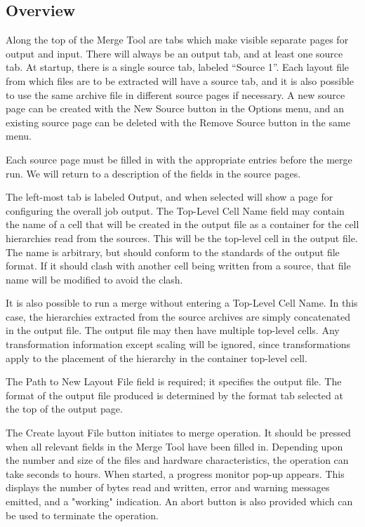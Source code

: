 \subsection{Overview}

Along the top of the {\cb Merge Tool} are tabs which make visible
separate pages for output and input.  There will always be an output
tab, and at least one source tab.  At startup, there is a single
source tab, labeled ``Source 1''.  Each layout file from which files
are to be extracted will have a source tab, and it is also possible to
use the same archive file in different source pages if necessary.  A
new source page can be created with the {\cb New Source} button in the
{\cb Options} menu, and an existing source page can be deleted with
the {\cb Remove Source} button in the same menu.

Each source page must be filled in with the appropriate entries before
the merge run.  We will return to a description of the fields in the
source pages.

The left-most tab is labeled {\cb Output}, and when selected will show
a page for configuring the overall job output.  The {\cb Top-Level
Cell Name} field may contain the name of a cell that will be created
in the output file as a container for the cell hierarchies read from
the sources.  This will be the top-level cell in the output file.  The
name is arbitrary, but should conform to the standards of the output
file format.  If it should clash with another cell being written from
a source, that file name will be modified to avoid the clash.

It is also possible to run a merge without entering a {\cb Top-Level
Cell Name}.  In this case, the hierarchies extracted from the source
archives are simply concatenated in the output file.  The output file
may then have multiple top-level cells.  Any transformation
information except scaling will be ignored, since transformations
apply to the placement of the hierarchy in the container top-level
cell.

The {\cb Path to New Layout File} field is required; it specifies the
output file.  The format of the output file produced is determined by
the format tab selected at the top of the output page.

The {\cb Create layout File} button initiates to merge operation.  It
should be pressed when all relevant fields in the {\cb Merge Tool}
have been filled in.  Depending upon the number and size of the files
and hardware characteristics, the operation can take seconds to hours. 
When started, a progress monitor pop-up appears.  This displays the
number of bytes read and written, error and warning messages emitted,
and a "working" indication.  An abort button is also provided which
can be used to terminate the operation.

